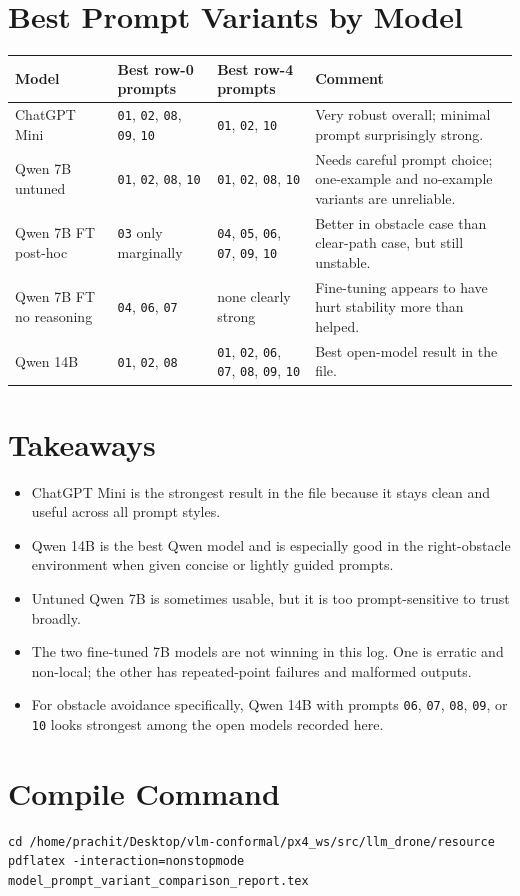 \documentclass[10pt]{article}
\newcommand{\code}[1]{\texttt{#1}}
\begin{document}
\section*{Best Prompt Variants by Model}
\begin{table}[H]
\centering
\begin{tabularx}{\textwidth}{p{3.1cm}p{2.4cm}p{2.4cm}Y}
\toprule
Model & Best row-0 prompts & Best row-4 prompts & Comment \\
\midrule
ChatGPT Mini & \code{01}, \code{02}, \code{08}, \code{09}, \code{10} & \code{01}, \code{02}, \code{10} & Very robust overall; minimal prompt surprisingly strong. \\
Qwen 7B untuned & \code{01}, \code{02}, \code{08}, \code{10} & \code{01}, \code{02}, \code{08}, \code{10} & Needs careful prompt choice; one-example and no-example variants are unreliable. \\
Qwen 7B FT post-hoc & \code{03} only marginally & \code{04}, \code{05}, \code{06}, \code{07}, \code{09}, \code{10} & Better in obstacle case than clear-path case, but still unstable. \\
Qwen 7B FT no reasoning & \code{04}, \code{06}, \code{07} & none clearly strong & Fine-tuning appears to have hurt stability more than helped. \\
Qwen 14B & \code{01}, \code{02}, \code{08} & \code{01}, \code{02}, \code{06}, \code{07}, \code{08}, \code{09}, \code{10} & Best open-model result in the file. \\
\bottomrule
\end{tabularx}
\end{table}

\section*{Takeaways}
\begin{itemize}
  \item ChatGPT Mini is the strongest result in the file because it stays clean and useful across all prompt styles.
  \item Qwen 14B is the best Qwen model and is especially good in the right-obstacle environment when given concise or lightly guided prompts.
  \item Untuned Qwen 7B is sometimes usable, but it is too prompt-sensitive to trust broadly.
  \item The two fine-tuned 7B models are not winning in this log. One is erratic and non-local; the other has repeated-point failures and malformed outputs.
  \item For obstacle avoidance specifically, Qwen 14B with prompts \code{06}, \code{07}, \code{08}, \code{09}, or \code{10} looks strongest among the open models recorded here.
\end{itemize}

\section*{Compile Command}
\begin{verbatim}
cd /home/prachit/Desktop/vlm-conformal/px4_ws/src/llm_drone/resource
pdflatex -interaction=nonstopmode model_prompt_variant_comparison_report.tex
\end{verbatim}
\end{document}
